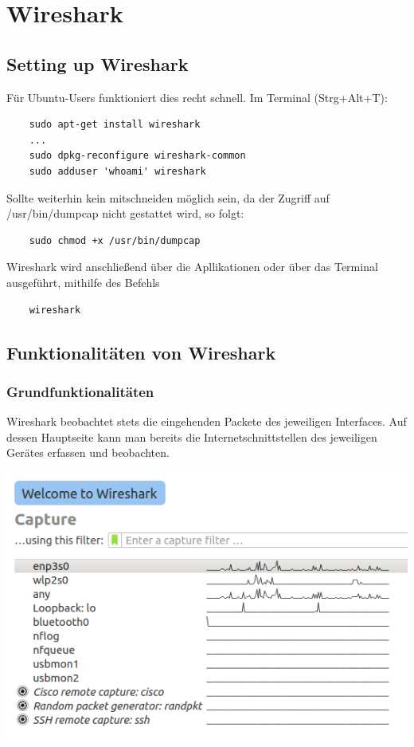 \documentclass[11pt]{article}
\begin{document}
    \section{Wireshark}
    \subsection{Setting up Wireshark}
    Für Ubuntu-Users funktioniert dies recht schnell.
    Im Terminal (Strg+Alt+T):
    \begin{verbatim}
    sudo apt-get install wireshark
    ...
    sudo dpkg-reconfigure wireshark-common
    sudo adduser 'whoami' wireshark
    \end{verbatim}
    Sollte weiterhin kein mitschneiden möglich sein, da der Zugriff auf /usr/bin/dumpcap nicht gestattet wird, so folgt:
    \begin{verbatim}
    sudo chmod +x /usr/bin/dumpcap
    \end{verbatim}
    Wireshark wird anschließend über die Apllikationen oder über das Terminal ausgeführt, mithilfe des Befehls
    \begin{verbatim}
    wireshark
    \end{verbatim}
\pagebreak
    \subsection{Funktionalitäten von Wireshark}
    \subsubsection{Grundfunktionalitäten}
    Wireshark beobachtet stets die eingehenden Packete des jeweiligen Interfaces.
    Auf dessen Hauptseite kann man bereits die Internetschnittstellen des jeweiligen Gerätes erfassen und beobachten.

    \includegraphics[width=\textwidth]{WiresharkMain.png}
\end{document}
